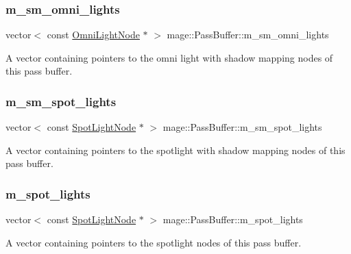 \subsubsection{\texorpdfstring{m\+\_\+sm\+\_\+omni\+\_\+lights}{m\_sm\_omni\_lights}}
{\footnotesize\ttfamily vector$<$ const \hyperlink{namespacemage_a1724c6e6b6b5ba535cdd967cbbb4a669}{Omni\+Light\+Node} $\ast$ $>$ mage\+::\+Pass\+Buffer\+::m\+\_\+sm\+\_\+omni\+\_\+lights\hspace{0.3cm}{\ttfamily [private]}}

A vector containing pointers to the omni light with shadow mapping nodes of this pass buffer. \hypertarget{structmage_1_1_pass_buffer_aa28fb6d14ea463f82f35117e8dfa23fc}{}\label{structmage_1_1_pass_buffer_aa28fb6d14ea463f82f35117e8dfa23fc} 
\subsubsection{\texorpdfstring{m\+\_\+sm\+\_\+spot\+\_\+lights}{m\_sm\_spot\_lights}}
{\footnotesize\ttfamily vector$<$ const \hyperlink{namespacemage_aeed5dee4ff6c591eabb0e9114256df4a}{Spot\+Light\+Node} $\ast$ $>$ mage\+::\+Pass\+Buffer\+::m\+\_\+sm\+\_\+spot\+\_\+lights\hspace{0.3cm}{\ttfamily [private]}}

A vector containing pointers to the spotlight with shadow mapping nodes of this pass buffer. \hypertarget{structmage_1_1_pass_buffer_a45b9dd8e0ecb9c0110b53a5a744519bb}{}\label{structmage_1_1_pass_buffer_a45b9dd8e0ecb9c0110b53a5a744519bb} 
\subsubsection{\texorpdfstring{m\+\_\+spot\+\_\+lights}{m\_spot\_lights}}
{\footnotesize\ttfamily vector$<$ const \hyperlink{namespacemage_aeed5dee4ff6c591eabb0e9114256df4a}{Spot\+Light\+Node} $\ast$ $>$ mage\+::\+Pass\+Buffer\+::m\+\_\+spot\+\_\+lights\hspace{0.3cm}{\ttfamily [private]}}

A vector containing pointers to the spotlight nodes of this pass buffer. \hypertarget{structmage_1_1_pass_buffer_ad742ad6712a63e9d58621da83a7fb900}{}\label{structmage_1_1_pass_buffer_ad742ad6712a63e9d58621da83a7fb900} 
